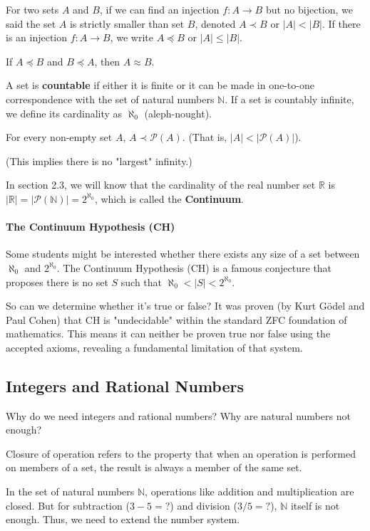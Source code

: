 \begin{definition}
For two sets $A$ and $B$, if we can find an injection $f: A \to B$ but no bijection, we said the set $A$ is strictly smaller than set $B$, denoted $A \prec B$ or $|A| < |B|$. If there is an injection $f: A \to B$, we write $A \preceq B$ or $|A| \le |B|$.
\end{definition}

\begin{theorem}
If $A \preceq B$ and $B \preceq A$, then $A \approx B$.
\end{theorem}

\begin{definition}
A set is \textbf{countable} if either it is finite or it can be made in one-to-one correspondence with the set of natural numbers $\mathbb{N}$. If a set is countably infinite, we define its cardinality as $\aleph_0$ (aleph-nought).
\end{definition}

\begin{theorem}
For every non-empty set $A$, $A \prec \mathcal{P}(A)$. (That is, $|A| < |\mathcal{P}(A)|$).
\end{theorem}
(This implies there is no "largest" infinity.)

In section 2.3, we will know that the cardinality of the real number set $\mathbb{R}$ is $|\mathbb{R}| = |\mathcal{P}(\mathbb{N})| = 2^{\aleph_0}$, which is called the \textbf{Continuum}.

\paragraph{The Continuum Hypothesis (CH)}
Some students might be interested whether there exists any size of a set between $\aleph_0$ and $2^{\aleph_0}$. The Continuum Hypothesis (CH) is a famous conjecture that proposes there is no set $S$ such that $\aleph_0 < |S| < 2^{\aleph_0}$.

So can we determine whether it’s true or false? It was proven (by Kurt Gödel and Paul Cohen) that CH is "undecidable" within the standard ZFC foundation of mathematics. This means it can neither be proven true nor false using the accepted axioms, revealing a fundamental limitation of that system.

\subsection{Integers and Rational Numbers}
Why do we need integers and rational numbers? Why are natural numbers not enough?
\begin{definition}
Closure of operation refers to the property that when an operation is performed on members of a set, the result is always a member of the same set.
\end{definition}
In the set of natural numbers $\mathbb{N}$, operations like addition and multiplication are closed. But for subtraction ($3 - 5 = ?$) and division ($3 / 5 = ?$), $\mathbb{N}$ itself is not enough. Thus, we need to extend the number system.

